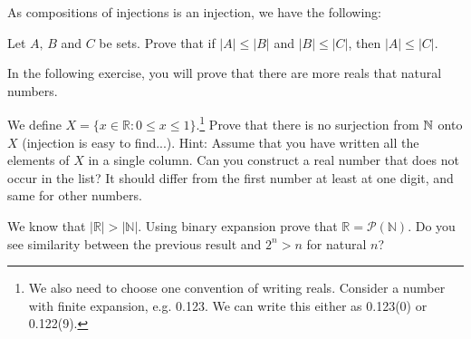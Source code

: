 %

As compositions of injections is an injection, we have the following:

\begin{exercise}
	Let $A,\,B$ and $C$ be sets. Prove that if $|A|\le |B|$ and $|B|\le |C|$, then $|A|\le |C|$.
\end{exercise}

In the following exercise, you will prove that there are more reals that natural numbers.

\begin{exercise}
	We define $X=\{x\in \mathbb R : 0\le x\le 1\}$.\footnote{We also need to choose one
	 convention of writing reals. Consider a number with finite expansion, e.g. 0.123. We can write this either as 0.123(0) or 0.122(9).}
	Prove that there is no surjection from $\mathbb N$ onto $X$ (injection is easy to find...). Hint: Assume that you have written all the elements of $X$ in a single column. Can you construct a real number that does not occur in the list? It should differ from the first number at least at one digit, and same for other numbers.
\end{exercise}

\begin{exercise}
	We know that $|\mathbb R| > |\mathbb N|$. Using binary expansion prove that $\mathbb R=\mathcal P(\mathbb N)$. Do you see similarity between the previous result and $2^n > n$ for natural $n$?
\end{exercise}

